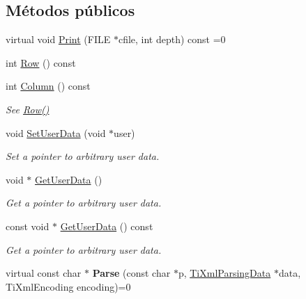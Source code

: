 \subsection*{\-Métodos públicos}
\begin{DoxyCompactItemize}
\item 
virtual void \hyperlink{classTiXmlBase_a0de56b3f2ef14c65091a3b916437b512}{\-Print} (\-F\-I\-L\-E $\ast$cfile, int depth) const =0
\item 
int \hyperlink{classTiXmlBase_a024bceb070188df92c2a8d8852dd0853}{\-Row} () const 
\item 
\hypertarget{classTiXmlBase_ab54bfb9b70fe6dd276e7b279cab7f003}{int \hyperlink{classTiXmlBase_ab54bfb9b70fe6dd276e7b279cab7f003}{\-Column} () const }\label{classTiXmlBase_ab54bfb9b70fe6dd276e7b279cab7f003}

\begin{DoxyCompactList}\small\item\em \-See \hyperlink{classTiXmlBase_a024bceb070188df92c2a8d8852dd0853}{\-Row()} \end{DoxyCompactList}\item 
\hypertarget{classTiXmlBase_ac6b3e0f790930d4970ec30764e937b5d}{void \hyperlink{classTiXmlBase_ac6b3e0f790930d4970ec30764e937b5d}{\-Set\-User\-Data} (void $\ast$user)}\label{classTiXmlBase_ac6b3e0f790930d4970ec30764e937b5d}

\begin{DoxyCompactList}\small\item\em \-Set a pointer to arbitrary user data. \end{DoxyCompactList}\item 
\hypertarget{classTiXmlBase_a6559a530ca6763fc301a14d77ed28c17}{void $\ast$ \hyperlink{classTiXmlBase_a6559a530ca6763fc301a14d77ed28c17}{\-Get\-User\-Data} ()}\label{classTiXmlBase_a6559a530ca6763fc301a14d77ed28c17}

\begin{DoxyCompactList}\small\item\em \-Get a pointer to arbitrary user data. \end{DoxyCompactList}\item 
\hypertarget{classTiXmlBase_ad0120210e4680ef2088601753ce0ede4}{const void $\ast$ \hyperlink{classTiXmlBase_ad0120210e4680ef2088601753ce0ede4}{\-Get\-User\-Data} () const }\label{classTiXmlBase_ad0120210e4680ef2088601753ce0ede4}

\begin{DoxyCompactList}\small\item\em \-Get a pointer to arbitrary user data. \end{DoxyCompactList}\item 
\hypertarget{classTiXmlBase_a00e4edb0219d00a1379c856e5a1d2025}{virtual const char $\ast$ {\bfseries \-Parse} (const char $\ast$p, \hyperlink{classTiXmlParsingData}{\-Ti\-Xml\-Parsing\-Data} $\ast$data, \-Ti\-Xml\-Encoding encoding)=0}\label{classTiXmlBase_a00e4edb0219d00a1379c856e5a1d2025}

\end{DoxyCompactItemize}
